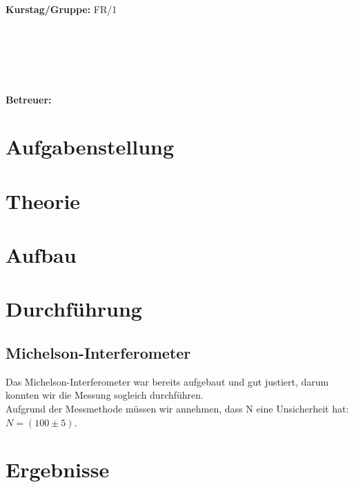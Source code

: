 \documentclass{article}
\begin{document}
\begin{verbatim}


\end{verbatim}
			\begin{flushleft}
			\textbf{\Large{Kurstag/Gruppe:}} \Large{FR/1}
			\end{flushleft}

\begin{verbatim}






\end{verbatim}
			\begin{flushleft}
			\LARGE{\textbf{Betreuer:\Large{ }}}		
			\end{flushleft}
			
\section{Aufgabenstellung}

\section{Theorie}
\subsection{}

\section{Aufbau}

\section{Durchführung}

\subsection{Michelson-Interferometer}
Das Michelson-Interferometer war bereits aufgebaut und gut justiert, darum konnten wir die Messung sogleich durchführen.\\
Aufgrund der Messmethode müssen wir annehmen, dass N eine Unsicherheit hat: $N=(100 \pm 5)$.

\section{Ergebnisse}
\end{document}
